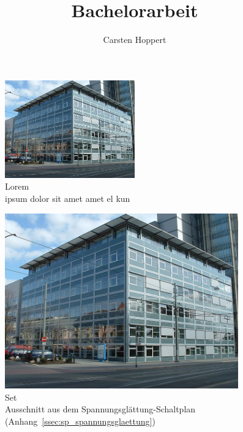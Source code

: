 \documentclass[a4paper]{scrartcl}
\author{Carsten Hoppert}
\title{Bachelorarbeit}
\begin{document}
\begin{figure}[htpb]
  \centering
  \includegraphics[width=0.5\textwidth]{infozentrum}
  \caption[Alternative]{Lorem\\ ipsum dolor sit amet amet el kun}
\end{figure}

\begin{figure}[htbp]
\centering
\includegraphics[width=0.8983294824399262\textwidth]{infozentrum}
\caption[Set der Feinmessplatine]{Set\\ Ausschnitt aus dem Spannungsglättung-Schaltplan (Anhang~\ref{ssec:sp_spannungsglaettung})}
\label{fig:spannungsglaettung-set}
\end{figure}%
\end{document}
